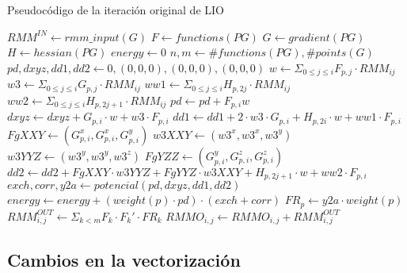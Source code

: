 \begin{algorithm}[H]
        \caption{Pseudoc\'odigo de la iteraci\'on original de LIO}
        \label{algo:lio-iteration}
        \begin{algorithmic}
              \State $RMM^{IN} \gets rmm\_input(G)$
              \State $F \gets functions(PG)$
              \State $G \gets gradient(PG)$
              \State $H \gets hessian(PG)$
              \State $energy \gets 0$
              \State $n,m \gets \# functions(PG), \# points(G)$
              \ForAll{$p \in [0..m)$}
                  \State $pd, dxyz,dd1,dd2 \gets 0, (0,0,0), (0,0,0), (0,0,0)$
                  \ForAll{$i \in [0..n)$}
                      \State $w \gets \Sigma_{0 \leq j \leq i} F_{p,j} \cdot RMM_{ij}$
                      \State $w3 \gets \Sigma_{0 \leq j \leq i} G_{p,j} \cdot RMM_{ij}$
                      \State $ww1 \gets \Sigma_{0 \leq j \leq i} H_{p,2j} \cdot RMM_{ij}$
                      \State $ww2 \gets \Sigma_{0 \leq j \leq i} H_{p,2j+1} \cdot RMM_{ij}$
                      \State $pd \gets pd + F_{p,i} w$
                      \State $dxyz \gets dxyz + G_{p,i} \cdot w + w3 \cdot F_{p,i}$
                      \State $dd1 \gets dd1 + 2 \cdot w3 \cdot G_{p,i} + H_{p,2i} \cdot w + ww1 \cdot F_{p,i}$
                      \State $FgXXY \gets (G_{p,i}^x, G_{p,i}^x, G_{p,i}^y)$
                      \State $w3XXY \gets (w3^x, w3^x, w3^y)$
                      \State $w3YYZ \gets (w3^y, w3^y, w3^z)$
                      \State $FgYZZ \gets (G_{p,i}^y, G_{p,i}^z, G_{p,i}^z)$
                      \State $dd2 \gets dd2 + FgXXY \cdot w3YYZ + FgYYZ \cdot w3XXY + H_{p,2j+1} \cdot w + ww2 \cdot F_{p,i}$
                  \EndFor 
                  \State $exch, corr, y2a \gets potencial(pd, dxyz, dd1, dd2)$
                  \State $energy \gets energy + (weight(p) \cdot pd) \cdot (exch + corr)$
                  \State $FR_p \gets y2a \cdot weight(p)$
              \EndFor
              \State $RMM^{OUT}_{i,j} \gets \Sigma_{k < m} F_k \cdot F_k' \cdot FR_k$
                  \State $RMMO_{i,j} \gets RMMO_{i,j} + RMM^{OUT}_{i,j}$
              \EndFor
            \EndFunction
        \end{algorithmic}
\end{algorithm}

\subsection{Cambios en la vectorizaci\'on}


